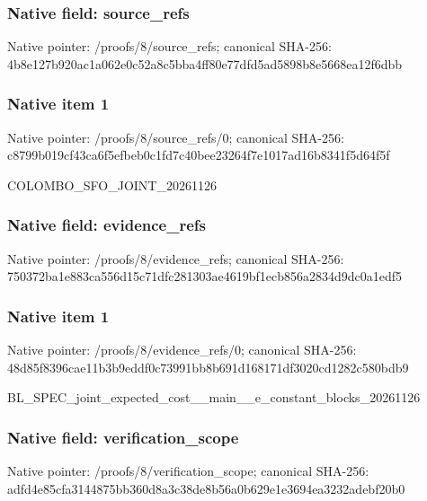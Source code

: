 \documentclass[10pt,a4paper]{article}
\begin{document}
\subsubsection{Native field: source\_refs}


Native pointer: /proofs/8/source\_refs; canonical SHA-256: 4b8e127b920ac1a062e0c52a\allowbreak{}8c5bba4ff80e77dfd5ad5898\allowbreak{}b8e5668ea12f6dbb



\subsubsection{Native item 1}


Native pointer: /proofs/8/source\_refs/0; canonical SHA-256: c8799b019cf43ca6f5efbeb0\allowbreak{}c1fd7c40bee23264f7e1017a\allowbreak{}d16b8341f5d64f5f


COLOMBO\_SFO\_JOINT\_20261126


\subsubsection{Native field: evidence\_refs}


Native pointer: /proofs/8/evidence\_refs; canonical SHA-256: 750372ba1e883ca556d15c71\allowbreak{}dfc281303ae4619bf1ecb856\allowbreak{}a2834d9dc0a1edf5



\subsubsection{Native item 1}


Native pointer: /proofs/8/evidence\_refs/0; canonical SHA-256: 48d85f8396cae11b3b9eddf0\allowbreak{}c73991bb8b691d168171df30\allowbreak{}20cd1282c580bdb9


BL\_SPEC\_joint\_expected\_c\allowbreak{}ost\_\_main\_\_e\_constant\_bl\allowbreak{}ocks\_20261126


\subsubsection{Native field: verification\_scope}


Native pointer: /proofs/8/verification\_scope; canonical SHA-256: adfd4e85cfa3144875bb360d\allowbreak{}8a3c38de8b56a0b629e1e369\allowbreak{}4ea3232adebf20b0
\end{document}
